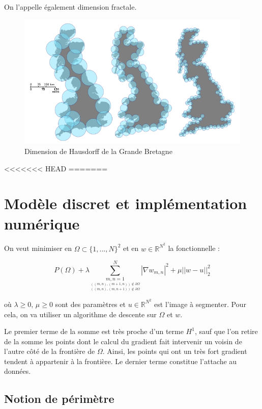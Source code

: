 On l'appelle également dimension fractale. 

\begin{figure}[H]
\centering
\includegraphics[scale=0.5]{images/hausdorff.png}
\caption{Dimension de Hausdorff de la Grande Bretagne }
\end{figure}



<<<<<<< HEAD
=======
\section{Modèle discret et implémentation numérique}

On veut minimiser en $\Omega \subset \{1,...,N\}^2$ et en $w \in \mathbb{R}^{N^2}$ la fonctionnelle : 

\[ P(\Omega) + \lambda \sum \limits_{\underset{((m,n), (m, n+1)) \notin \partial \Omega}{\underset{((m,n),(m+1, n)) \notin \partial \Omega}{m,n = 1}}}^{N} |\nabla w_{m,n}|^2 + \mu ||w - u ||_2^2 \]

où $\lambda \geq 0$, $\mu \geq 0$ sont des paramètres et $u \in \mathbb{R}^{N^2}$ est l'image à segmenter. Pour cela, on va utiliser un algorithme de descente sur $\Omega$ et $w$.

\bigskip

Le premier terme de la somme est très proche d'un terme $H^1$, sauf que l'on retire de la somme les points dont le calcul du gradient fait intervenir un voisin de l'autre côté de la frontière de $\Omega$. 
Ainsi, les points qui ont un très fort gradient tendent à appartenir à la frontière. Le dernier terme constitue l'attache au données. 

\subsection{Notion de périmètre}

